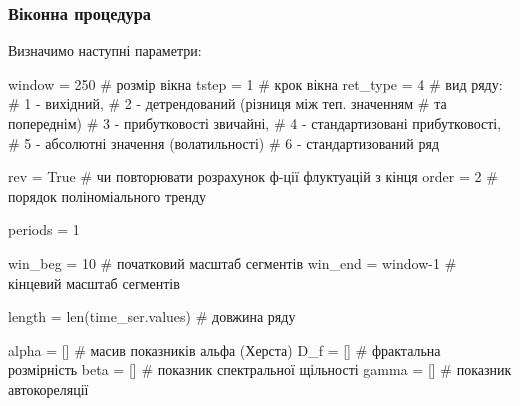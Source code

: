 \documentclass[
  letterpaper,
]{report}
\newenvironment{Shaded}{\begin{snugshade}}{\end{snugshade}}
\newcommand{\BuiltInTok}[1]{\textcolor[rgb]{0.00,0.23,0.31}{#1}}
\newcommand{\CommentTok}[1]{\textcolor[rgb]{0.37,0.37,0.37}{#1}}
\newcommand{\DecValTok}[1]{\textcolor[rgb]{0.68,0.00,0.00}{#1}}
\newcommand{\NormalTok}[1]{\textcolor[rgb]{0.00,0.23,0.31}{#1}}
\newcommand{\OperatorTok}[1]{\textcolor[rgb]{0.37,0.37,0.37}{#1}}
\newcommand{\VariableTok}[1]{\textcolor[rgb]{0.07,0.07,0.07}{#1}}
\begin{document}
\hypertarget{ux432ux456ux43aux43eux43dux43dux430-ux43fux440ux43eux446ux435ux434ux443ux440ux430-2}{%
\subsubsection{Віконна
процедура}\label{ux432ux456ux43aux43eux43dux43dux430-ux43fux440ux43eux446ux435ux434ux443ux440ux430-2}}

Визначимо наступні параметри:

\begin{Shaded}
\begin{Highlighting}[]
\NormalTok{window }\OperatorTok{=} \DecValTok{250}    \CommentTok{\# розмір вікна}
\NormalTok{tstep }\OperatorTok{=} \DecValTok{1}       \CommentTok{\# крок вікна}
\NormalTok{ret\_type }\OperatorTok{=} \DecValTok{4}    \CommentTok{\# вид ряду: }
                \CommentTok{\# 1 {-} вихідний, }
                \CommentTok{\# 2 {-} детрендований (різниця між теп. значенням }
                                                \CommentTok{\# та попереднім)}
                \CommentTok{\# 3 {-} прибутковості звичайні, }
                \CommentTok{\# 4 {-} стандартизовані прибутковості, }
                \CommentTok{\# 5 {-} абсолютні значення (волатильності)}
                \CommentTok{\# 6 {-} стандартизований ряд}

\NormalTok{rev }\OperatorTok{=} \VariableTok{True}      \CommentTok{\# чи повторювати розрахунок ф{-}ції флуктуацій з кінця}
\NormalTok{order }\OperatorTok{=} \DecValTok{2}       \CommentTok{\# порядок поліноміального тренду}

\NormalTok{periods }\OperatorTok{=} \DecValTok{1}

\NormalTok{win\_beg }\OperatorTok{=} \DecValTok{10}             \CommentTok{\# початковий масштаб сегментів}
\NormalTok{win\_end }\OperatorTok{=}\NormalTok{ window}\OperatorTok{{-}}\DecValTok{1}       \CommentTok{\# кінцевий масштаб сегментів}



\NormalTok{length }\OperatorTok{=} \BuiltInTok{len}\NormalTok{(time\_ser.values) }\CommentTok{\# довжина ряду}

\NormalTok{alpha }\OperatorTok{=}\NormalTok{ []               }\CommentTok{\# масив показників альфа (Херста)}
\NormalTok{D\_f }\OperatorTok{=}\NormalTok{ []                 }\CommentTok{\# фрактальна розмірність}
\NormalTok{beta }\OperatorTok{=}\NormalTok{ []                }\CommentTok{\# показник спектральної щільності}
\NormalTok{gamma }\OperatorTok{=}\NormalTok{ []               }\CommentTok{\# показник автокореляції}
\end{Highlighting}
\end{Shaded}
\end{document}
